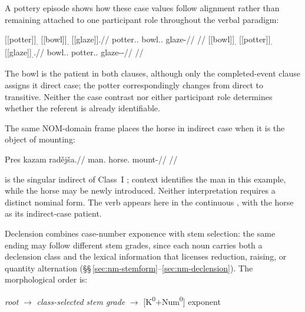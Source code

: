 A pottery episode shows how these case values follow alignment rather than
remaining attached to one participant role throughout the verbal paradigm:

\pex\label{ex:nm-slot-case-alignment}
\a
\begingl
\gla \textnormal{[[potter]]}\textsubscript{\Dir{}.\Sg{}} \textnormal{[[bowl]]}\textsubscript{\Ind{}.\Sg{}} \textnormal{[[glaze]]}\textsubscript{\Prog{}}.//
\glb potter.\Dir{}.\Sg{} bowl.\Ind{}.\Sg{} glaze-\Prog{}//
\glft {} //
\endgl
\a
\begingl
\gla \textnormal{[[bowl]]}\textsubscript{\Dir{}.\Sg{}} \textnormal{[[potter]]}\textsubscript{\Trs{}.\Sg{}} \textnormal{[[glaze]]}\textsubscript{\Trs{}.\Pf{}}.//
\glb bowl.\Dir{}.\Sg{} potter.\Trs{}.\Sg{} glaze-\Trs{}-\Pf{}//
\glft {} //
\endgl
\xe

The bowl is the patient in both clauses, although only the completed-event
clause assigns it direct case; the potter correspondingly changes from
direct to transitive. Neither the case contrast nor either participant role
determines whether the referent is already identifiable.

The same NOM-domain frame places the horse in indirect case when it is
the object of mounting:

\ex\label{ex:nm-mount-horse}%
\begingl
\gla Pres kazam radějša.//
\glb man.\Dir{} horse.\Ind{} mount-\Cont{}//
\glft {}//
\endgl
\xe

 is the singular indirect of Class~I ; context
identifies the man in this example, while the horse may be newly introduced.
Neither interpretation requires a distinct nominal form. The verb
 
appears here in the continuous , with the horse as its
indirect-case patient.

Declension combines case-number exponence with stem selection: the same ending
may follow different stem grades, since each noun carries both a declension
class and the lexical information that licenses reduction, raising, or quantity
alternation (§§\,\ref{sec:nm-stemform}--\ref{sec:nm-declension}). The
morphological order is:

\medskip
\begin{center}
\textit{root} $\rightarrow$
\textit{class-selected stem grade} $\rightarrow$
[K\textsuperscript{0}$+$Num\textsuperscript{0}] exponent
\end{center}
\medskip

